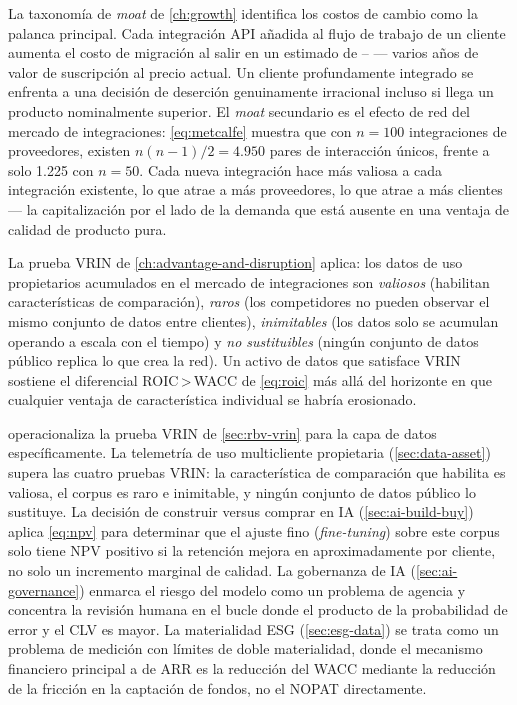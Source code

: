 La taxonomía de \emph{moat} de \cref{ch:growth} identifica los costos de cambio como la palanca
principal. Cada integración API añadida al flujo de trabajo de un cliente aumenta el costo de
migración al salir en un estimado de -- --- varios años de valor de
suscripción al precio actual. Un cliente profundamente integrado se enfrenta a una decisión de
deserción genuinamente irracional incluso si llega un producto nominalmente superior. El
\emph{moat} secundario es el efecto de red del mercado de integraciones: \cref{eq:metcalfe}
muestra que con \(n=100\) integraciones de proveedores, existen \(n(n-1)/2 = 4{.}950\) pares
de interacción únicos, frente a solo 1.225 con \(n=50\). Cada nueva integración hace más valiosa
a cada integración existente, lo que atrae a más proveedores, lo que atrae a más clientes ---
la capitalización por el lado de la demanda que está ausente en una ventaja de calidad de
producto pura.

La prueba VRIN de \cref{ch:advantage-and-disruption} aplica: los datos de uso propietarios
acumulados en el mercado de integraciones son \emph{valiosos} (habilitan características de
comparación), \emph{raros} (los competidores no pueden observar el mismo conjunto de datos
entre clientes), \emph{inimitables} (los datos solo se acumulan operando a escala con el tiempo)
y \emph{no sustituibles} (ningún conjunto de datos público replica lo que crea la red).
Un activo de datos que satisface VRIN sostiene el diferencial ROIC\,>\,WACC de \cref{eq:roic}
más allá del horizonte en que cualquier ventaja de característica individual se habría erosionado.

 operacionaliza la prueba VRIN de \cref{sec:rbv-vrin} para la
capa de datos específicamente. La telemetría de uso multicliente propietaria (\cref{sec:data-asset})
supera las cuatro pruebas VRIN: la característica de comparación que habilita es valiosa, el
corpus es raro e inimitable, y ningún conjunto de datos público lo sustituye. La decisión de
construir versus comprar en IA (\cref{sec:ai-build-buy}) aplica \cref{eq:npv} para determinar
que el ajuste fino (\emph{fine-tuning}) sobre este corpus solo tiene NPV positivo si la retención
mejora en aproximadamente  por cliente, no solo un incremento marginal de calidad. La
gobernanza de IA (\cref{sec:ai-governance}) enmarca el riesgo del modelo como un problema de
agencia y concentra la revisión humana en el bucle donde el producto de la probabilidad de error
y el CLV es mayor. La materialidad ESG (\cref{sec:esg-data}) se trata como un problema de
medición con límites de doble materialidad, donde el mecanismo financiero principal a
 de ARR es la reducción del WACC mediante la reducción de la fricción en la
captación de fondos, no el NOPAT directamente.

